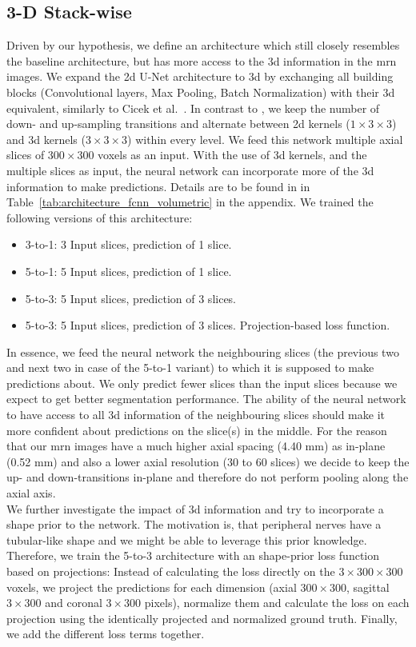 \subsection{3-D Stack-wise}
Driven by our hypothesis, we define an architecture which still closely resembles the baseline architecture, but has more access to the \gls{3d} information in the \gls{mrn} images.
We expand the \gls{2d} U-Net architecture to \gls{3d} by exchanging all building blocks (Convolutional layers, Max Pooling, Batch Normalization) with their \gls{3d} equivalent, similarly to Cicek et al.~\cite{Cicek20163DAnnotation}. In contrast to \cite{Cicek20163DAnnotation}, we keep the number of down- and up-sampling transitions and alternate between \gls{2d} kernels ($1 \times 3 \times 3$) and \gls{3d} kernels ($3 \times 3 \times 3$) within every level.
We feed this network multiple axial slices of $300 \times 300$ voxels as an input.
With the use of \gls{3d} kernels, and the multiple slices as input, the neural network can incorporate more of the \gls{3d} information to make predictions.
Details are to be found in in Table~\ref{tab:architecture_fcnn_volumetric} in the appendix. We trained the following versions of this architecture:
\begin{itemize}
  \item 3-to-1: 3 Input slices, prediction of 1 slice.
  \item 5-to-1: 5 Input slices, prediction of 1 slice.
  \item 5-to-3: 5 Input slices, prediction of 3 slices.
  \item 5-to-3: 5 Input slices, prediction of 3 slices. Projection-based loss function.
\end{itemize}
In essence, we feed the neural network the neighbouring slices (the previous two and next two in case of the 5-to-1 variant) to which it is supposed to make predictions about. We only predict fewer slices than the input slices because we expect to get better segmentation performance. The ability of the neural network to have access to all \gls{3d} information of the neighbouring slices should make it more confident about predictions on the slice(s) in the middle.
For the reason that our \gls{mrn} images have a much higher axial spacing (4.40 mm) as in-plane (0.52 mm) and also a lower axial resolution (30 to 60 slices) we decide to keep the up- and down-transitions in-plane and therefore do not perform pooling along the axial axis.\\
We further investigate the impact of \gls{3d} information and try to incorporate a shape prior to the network. The motivation is, that peripheral nerves have a tubular-like shape and we might be able to leverage this prior knowledge. Therefore, we train the 5-to-3 architecture with an shape-prior loss function based on projections: Instead of calculating the loss directly on the $3 \times 300 \times 300$ voxels, we project the predictions for each dimension (axial $300 \times 300$, sagittal $3 \times 300$ and coronal $3 \times 300$ pixels), normalize them and calculate the loss on each projection using the identically projected and normalized ground truth. Finally, we add the different loss terms together.

